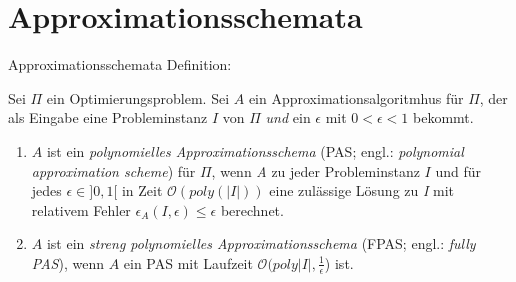 \section{Approximationsschemata}

\begin{frame}{Approximationsschemata}	
    Definition:
			
Sei $\Pi$ ein Optimierungsproblem. Sei $A$ ein Approximationsalgoritmhus für $\Pi$, der als Eingabe eine Probleminstanz $I$ von $\Pi$ \textit{und} ein $\epsilon$ mit $0 < \epsilon < 1$ bekommt.

\begin{enumerate}
\item
$A$ ist ein \textit{polynomielles Approximationsschema} (PAS; engl.: \textit{polynomial approximation scheme}) für $\Pi$, wenn \textit{A} zu jeder Probleminstanz $I$ und für jedes $\epsilon \in ] 0,1 [$ in Zeit $\mathcal O(poly(|I|))$ eine zulässige Lösung zu \textit{I} mit relativem Fehler $\epsilon_A(\textit{I},\epsilon) \leqslant \epsilon$ berechnet.

\item
$A$ ist ein \textit{streng polynomielles Approximationsschema} (FPAS; engl.: \textit{fully PAS}), wenn $A$ ein PAS mit Laufzeit $\mathcal O(poly|I|, \frac{1}{\epsilon}$) ist.

\end{enumerate}		      
\end{frame}
